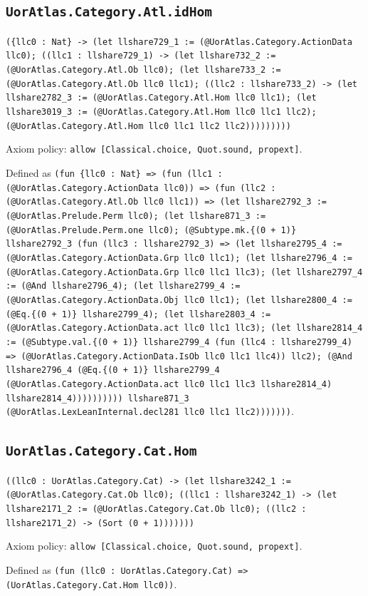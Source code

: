 \documentclass[11pt]{article}
\begin{document}
\subsection*{\texttt{UorAtlas.Category.Atl.idHom}}
\noindent\texttt{(\{llc0 : Nat\} -> (let llshare729\_1 := (@UorAtlas.Category.ActionData llc0); ((llc1 : llshare729\_1) -> (let llshare732\_2 := (@UorAtlas.Category.Atl.Ob llc0); (let llshare733\_2 := (@UorAtlas.Category.Atl.Ob llc0 llc1); ((llc2 : llshare733\_2) -> (let llshare2782\_3 := (@UorAtlas.Category.Atl.Hom llc0 llc1); (let llshare3019\_3 := (@UorAtlas.Category.Atl.Hom llc0 llc1 llc2); (@UorAtlas.Category.Atl.Hom llc0 llc1 llc2 llc2)))))))))}\par
\noindent Axiom policy: \texttt{allow [Classical.choice, Quot.sound, propext]}.\par
\noindent Defined as \texttt{(fun \{llc0 : Nat\} => (fun (llc1 : (@UorAtlas.Category.ActionData llc0)) => (fun (llc2 : (@UorAtlas.Category.Atl.Ob llc0 llc1)) => (let llshare2792\_3 := (@UorAtlas.Prelude.Perm llc0); (let llshare871\_3 := (@UorAtlas.Prelude.Perm.one llc0); (@Subtype.mk.\{(0 + 1)\} llshare2792\_3 (fun (llc3 : llshare2792\_3) => (let llshare2795\_4 := (@UorAtlas.Category.ActionData.Grp llc0 llc1); (let llshare2796\_4 := (@UorAtlas.Category.ActionData.Grp llc0 llc1 llc3); (let llshare2797\_4 := (@And llshare2796\_4); (let llshare2799\_4 := (@UorAtlas.Category.ActionData.Obj llc0 llc1); (let llshare2800\_4 := (@Eq.\{(0 + 1)\} llshare2799\_4); (let llshare2803\_4 := (@UorAtlas.Category.ActionData.act llc0 llc1 llc3); (let llshare2814\_4 := (@Subtype.val.\{(0 + 1)\} llshare2799\_4 (fun (llc4 : llshare2799\_4) => (@UorAtlas.Category.ActionData.IsOb llc0 llc1 llc4)) llc2); (@And llshare2796\_4 (@Eq.\{(0 + 1)\} llshare2799\_4 (@UorAtlas.Category.ActionData.act llc0 llc1 llc3 llshare2814\_4) llshare2814\_4)))))))))) llshare871\_3 (@UorAtlas.LexLeanInternal.decl281 llc0 llc1 llc2)))))))}.\par
\subsection*{\texttt{UorAtlas.Category.Cat.Hom}}
\noindent\texttt{((llc0 : UorAtlas.Category.Cat) -> (let llshare3242\_1 := (@UorAtlas.Category.Cat.Ob llc0); ((llc1 : llshare3242\_1) -> (let llshare2171\_2 := (@UorAtlas.Category.Cat.Ob llc0); ((llc2 : llshare2171\_2) -> (Sort (0 + 1)))))))}\par
\noindent Axiom policy: \texttt{allow [Classical.choice, Quot.sound, propext]}.\par
\noindent Defined as \texttt{(fun (llc0 : UorAtlas.Category.Cat) => (UorAtlas.Category.Cat.Hom llc0))}.\par
\end{document}
